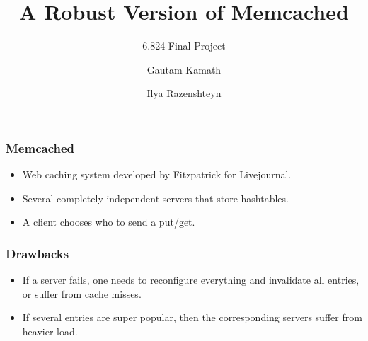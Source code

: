 \documentclass{beamer}
\title{A Robust Version of Memcached}
\subtitle{6.824 Final Project}
\author{Gautam Kamath \and Ilya Razenshteyn}
\institute{MIT}
\begin{document}
    \begin{frame}
      \titlepage
    \end{frame}
    \begin{frame}
        \frametitle{Memcached}
        \begin{itemize}
            \item Web caching system developed by Fitzpatrick for Livejournal.
            \item Several completely independent servers that store hashtables.
            \item A client chooses who to send a put/get.
        \end{itemize}
    \end{frame}
    \begin{frame}
        \frametitle{Drawbacks}
        \begin{itemize}
            \item If a server fails, one needs to reconfigure everything and invalidate
            all entries, or suffer from cache misses.
            \item If several entries are super popular, then the corresponding servers
            suffer from heavier load.
        \end{itemize}
    \end{frame}
\end{document}
